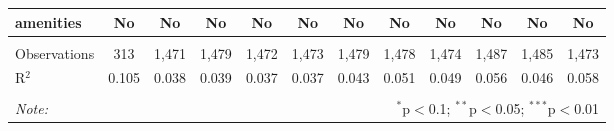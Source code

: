 \begin{table}[!htbp]
\begin{tabular}{@{\extracolsep{5pt}}lccccccccccc}
amenities & No & No & No & No & No & No & No & No & No & No & No \\ 
\hline \\[-1.8ex] 
Observations & 313 & 1,471 & 1,479 & 1,472 & 1,473 & 1,479 & 1,478 & 1,474 & 1,487 & 1,485 & 1,473 \\ 
R$^{2}$ & 0.105 & 0.038 & 0.039 & 0.037 & 0.037 & 0.043 & 0.051 & 0.049 & 0.056 & 0.046 & 0.058 \\ 
\hline 
\hline \\[-1.8ex] 
\textit{Note:}  & \multicolumn{11}{r}{$^{*}$p$<$0.1; $^{**}$p$<$0.05; $^{***}$p$<$0.01} \\ 
\end{tabular} 
\end{table} 
